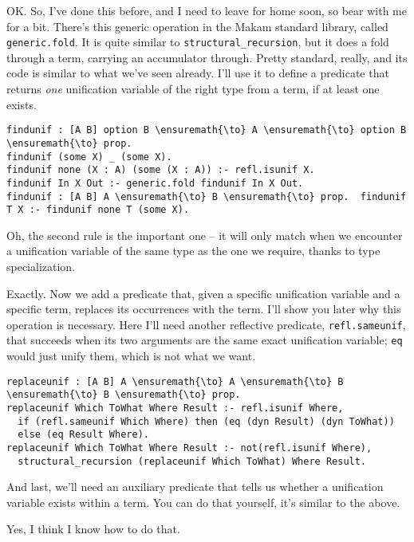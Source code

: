 \heroADVISOR{} OK. So, I've done this before, and I need to leave for home
soon, so bear with me for a bit. There's this generic operation in the
Makam standard library, called \texttt{generic.fold}. It is quite
similar to \texttt{structural\_recursion}, but it does a fold through a
term, carrying an accumulator through. Pretty standard, really, and its
code is similar to what we've seen already. I'll use it to define a
predicate that returns \emph{one} unification variable of the right type
from a term, if at least one exists.

\begin{verbatim}
findunif : [A B] option B \ensuremath{\to} A \ensuremath{\to} option B \ensuremath{\to} prop.
findunif (some X) _ (some X).
findunif none (X : A) (some (X : A)) :- refl.isunif X.
findunif In X Out :- generic.fold findunif In X Out.
findunif : [A B] A \ensuremath{\to} B \ensuremath{\to} prop.  findunif T X :- findunif none T (some X).
\end{verbatim}

\heroSTUDENT{} Oh, the second rule is the important one -- it will only match
when we encounter a unification variable of the same type as the one we
require, thanks to type specialization.

\heroADVISOR{} Exactly. Now we add a predicate that, given a specific
unification variable and a specific term, replaces its occurrences with
the term. I'll show you later why this operation is necessary. Here I'll
need another reflective predicate, \texttt{refl.sameunif}, that succeeds
when its two arguments are the same exact unification variable;
\texttt{eq} would just unify them, which is not what we want.

\begin{verbatim}
replaceunif : [A B] A \ensuremath{\to} A \ensuremath{\to} B \ensuremath{\to} B \ensuremath{\to} prop.
replaceunif Which ToWhat Where Result :- refl.isunif Where,
  if (refl.sameunif Which Where) then (eq (dyn Result) (dyn ToWhat))
  else (eq Result Where).
replaceunif Which ToWhat Where Result :- not(refl.isunif Where),
  structural_recursion (replaceunif Which ToWhat) Where Result.
\end{verbatim}

\heroADVISOR{} And last, we'll need an auxiliary predicate that tells us
whether a unification variable exists within a term. You can do that
yourself, it's similar to the above.

\heroSTUDENT{} Yes, I think I know how to do that.

